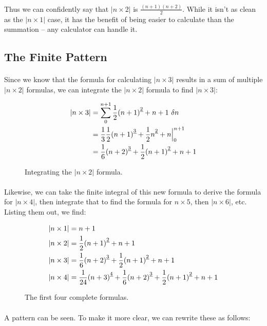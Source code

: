 \documentclass[12pt]{article}
\newcommand{\p}{\paragraph{}}
\newcommand{\fall}[1]{\strut^{\underline{#1}}}
\begin{document}
			\p Thus we can confidently say that $|n\times2|$ is $\frac{(n+1)(n+2)}{2}$. While it isn't as clean as the $|n\times1|$ case, it has the benefit of being easier to calculate than the summation -- any calculator can handle it.
			
		\subsection{The Finite Pattern}
		
			\p Since we know that the formula for calculating $|n\times3|$ results in a sum of multiple $|n\times2|$ formulas, we can integrate the $|n\times2|$ formula to find $|n\times3|$:
			
			\begin{figure}[h]
				\begin{align*}
					|n\times3| &= \sum_0^{n+1} \frac{1}{2}(n+1)\fall{2} + n + 1\ \delta n \\
					&= \frac{1}{3}\frac{1}{2}(n+1)\fall{3} + \frac{1}{2}n\fall{2} + n \Bigr|_0^{n+1}\\
					&=\frac{1}{6}(n+2)\fall{3} + \frac{1}{2}(n+1)\fall{2} + n + 1
				\end{align*}
				
				\caption{Integrating the $|n\times2|$ formula.}
			\end{figure}
		
			\p Likewise, we can take the finite integral of this new formula to derive the formula for $|n\times4|$, then integrate that to find the formula for $n\times5$, then $|n\times6|$, etc. Listing them out, we find:
			
			\begin{figure}[h]
				\begin{align*}
				|n\times1| &= n + 1\\
				|n\times2| &= \frac{1}{2}(n+1)\fall{2} + n + 1 \\
				|n\times3| &= \frac{1}{6}(n+2)\fall{3} + \frac{1}{2}(n+1)\fall{2} + n + 1 \\
				|n\times4| &= \frac{1}{24}(n+3)\fall{4} + \frac{1}{6}(n+2)\fall{3} + \frac{1}{2}(n+1)\fall{2} + n + 1
				\end{align*}
				
				\caption{The first four complete formulas.}
			\end{figure}
		
			\p A pattern can be seen. To make it more clear, we can rewrite these as follows:
			
\end{document}
